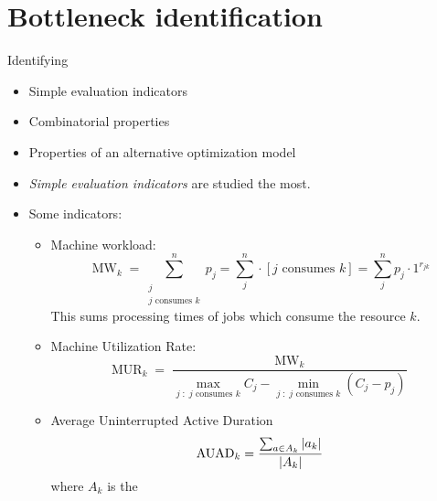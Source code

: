 \section*{Bottleneck identification}

Identifying 

\begin{itemize}
    \item Simple evaluation indicators
    \item Combinatorial properties
    \item Properties of an alternative optimization model
\end{itemize}

\begin{itemize}
    \item \emph{Simple evaluation indicators} are studied the most.

    \item Some indicators:
    \begin{itemize}
        \item Machine workload:
            $$
            \operatorname{MW}_k = \sum_{\substack{j\\ \text{$j$ consumes $k$}}}^n p_j = \sum_j^n \cdot \left[ \text{$j$ consumes $k$} \right]= \sum_j^n p_j \cdot 1^{r_{jk}}
            $$ 
            This sums processing times of jobs which consume the resource $k$.

        \item Machine Utilization Rate:
            $$
            \operatorname{MUR}_k = \frac{\operatorname{MW}_k}{\max_{j \;:\; \text{$j$ consumes $k$}} C_j - \min_{j \;:\; \text{$j$ consumes $k$}} (C_j - p_j)}
            $$

        \item Average Uninterrupted Active Duration
            $$
            \operatorname{AUAD}_k = \frac{\sum_{a \in A_k} \left|{a_k}\right|}{\left|{A_k}\right|}
            $$
            where $A_k$ is the 
    \end{itemize}
\end{itemize}

